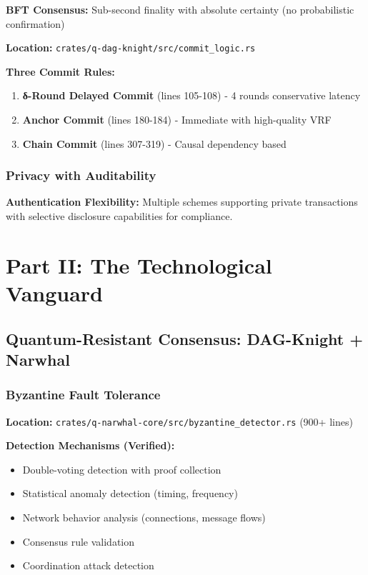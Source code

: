 \documentclass[11pt,a4paper]{article}
\begin{document}
\textbf{BFT Consensus:} Sub-second finality with absolute certainty (no probabilistic confirmation)

\textbf{Location:} \texttt{crates/q-dag-knight/src/commit\_logic.rs}

\textbf{Three Commit Rules:}
\begin{enumerate}
    \item \textbf{δ-Round Delayed Commit} (lines 105-108) - 4 rounds conservative latency
    \item \textbf{Anchor Commit} (lines 180-184) - Immediate with high-quality VRF
    \item \textbf{Chain Commit} (lines 307-319) - Causal dependency based
\end{enumerate}

\subsubsection{Privacy with Auditability}

\textbf{Authentication Flexibility:} Multiple schemes supporting private transactions with selective disclosure capabilities for compliance.

\section{Part II: The Technological Vanguard}

\subsection{Quantum-Resistant Consensus: DAG-Knight + Narwhal}

\subsubsection{Byzantine Fault Tolerance}

\textbf{Location:} \texttt{crates/q-narwhal-core/src/byzantine\_detector.rs} (900+ lines)

\textbf{Detection Mechanisms (Verified):}
\begin{itemize}
    \item Double-voting detection with proof collection
    \item Statistical anomaly detection (timing, frequency)
    \item Network behavior analysis (connections, message flows)
    \item Consensus rule validation
    \item Coordination attack detection
\end{itemize}
\end{document}
